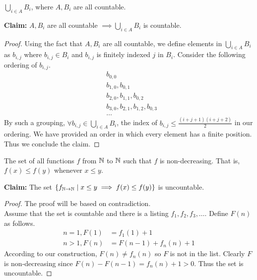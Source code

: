 \documentclass[11pt]{article}
\begin{document}
\newpage
{}

\begin{Parts}
    
    \Part $\bigcup_{i\in A} B_i$, where $A, B_i$ are all countable.

    \begin{Answer}
        \textbf{Claim:} $A, B_i$ are all countable $\implies \bigcup_{i \in A} B_i$ is countable. 
        \begin{proof}
            Using the fact that $A, B_i$ are all countable, we define elements in $\bigcup_{i \in A} B_i$ as $b_{i,j}$ where 
            $b_{i,j} \in B_i$ and $b_{i,j}$ is finitely indexed $j$ in $B_i$. Consider the following ordering of $b_{i,j}$. 
            \begin{align*}
                &b_{0,0} \\
                &b_{1,0}, b_{0,1} \\
                &b_{2,0}, b_{1,1}, b_{0,2} \\
                &b_{3,0}, b_{2,1}, b_{1,2}, b_{0,3} \\
                &\ldots
            \end{align*}
            By such a grouping, $\forall b_{i,j} \in \bigcup_{i \in A} B_i$, the index of $b_{i,j} \leq \frac{(i+j+1)(i+j+2)}{2}$ in our 
            ordering. We have provided an order in which every element has a finite position. Thus we conclude the claim. 
        \end{proof}
    \end{Answer}
    
    \Part The set of all functions $f$ from $\mathbb{N}$ to $\mathbb{N}$ such that $f$ is non-decreasing. That is, $f(x) \leq f(y)$ whenever $x \leq y$.

    \begin{Answer}
        \textbf{Claim:} The set $\{f_{\mathbb{N} \to \mathbb{N}} \mid x \leq y \implies f(x) \leq f(y)\}$ is uncountable. 
        \begin{proof}
            The proof will be based on contradiction. \\
            Assume that the set is countable and there is a listing $f_1, f_2, f_3, \ldots$. Define $F(n)$ as follows. 
            \begin{align*}
                n = 1, F(1) &= f_1(1) + 1 \\
                n > 1, F(n) &= F(n - 1) + f_n(n) + 1
            \end{align*}
            According to our construction, $F(n) \neq f_n(n)$ so $F$ is not in the list. Clearly $F$ is non-decreasing since 
            $F(n) - F(n - 1) = f_n(n) + 1 > 0$. Thus the set is uncountable. 
        \end{proof}
    \end{Answer}
    

\end{Parts}
\end{document}
